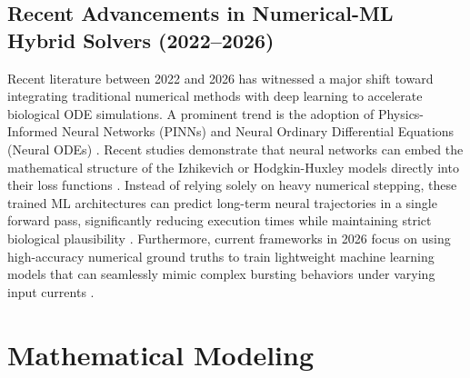 \documentclass[conference]{IEEEtran}
\begin{document}
\subsection{Recent Advancements in Numerical-ML Hybrid Solvers (2022--2026)}
Recent literature between 2022 and 2026 has witnessed a major shift toward integrating traditional numerical methods with deep learning to accelerate biological ODE simulations. A prominent trend is the adoption of Physics-Informed Neural Networks (PINNs) and Neural Ordinary Differential Equations (Neural ODEs) \cite{cuomo}. Recent studies demonstrate that neural networks can embed the mathematical structure of the Izhikevich or Hodgkin-Huxley models directly into their loss functions \cite{cuomo}. Instead of relying solely on heavy numerical stepping, these trained ML architectures can predict long-term neural trajectories in a single forward pass, significantly reducing execution times while maintaining strict biological plausibility \cite{lu}. Furthermore, current frameworks in 2026 focus on using high-accuracy numerical ground truths to train lightweight machine learning models that can seamlessly mimic complex bursting behaviors under varying input currents \cite{lu}.

\begin{table}[htbp]
\centering
\caption{Comparative Summary of Dynamic Neuron Models and Numerical Integration Schemes}
\label{tab:compare}
\end{table}

\section{Mathematical Modeling}
\end{document}
